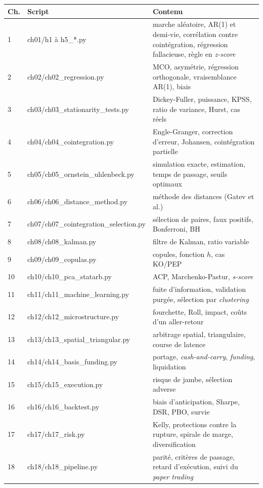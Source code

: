 \begin{center}\small
\begin{longtable}{>{\raggedright}p{1.1cm}>{\ttfamily\footnotesize}p{6.4cm}>{\raggedright\arraybackslash}p{6.0cm}}
\toprule
Ch. & \normalfont Script & Contenu \\
\midrule
\endhead
1 & ch01/h1 à h5\_*.py & marche aléatoire, AR(1) et demi-vie, corrélation contre cointégration, régression fallacieuse, règle en \emph{z-score} \\
2 & ch02/ch02\_regression.py & MCO, asymétrie, régression orthogonale, vraisemblance AR(1), biais \\
3 & ch03/ch03\_stationarity\_tests.py & Dickey-Fuller, puissance, KPSS, ratio de variance, Hurst, cas réels \\
4 & ch04/ch04\_cointegration.py & Engle-Granger, correction d'erreur, Johansen, cointégration partielle \\
5 & ch05/ch05\_ornstein\_uhlenbeck.py & simulation exacte, estimation, temps de passage, seuils optimaux \\
6 & ch06/ch06\_distance\_method.py & méthode des distances (Gatev et al.) \\
7 & ch07/ch07\_cointegration\_selection.py & sélection de paires, faux positifs, Bonferroni, BH \\
8 & ch08/ch08\_kalman.py & filtre de Kalman, ratio variable \\
9 & ch09/ch09\_copulas.py & copules, fonction $h$, cas KO/PEP \\
10 & ch10/ch10\_pca\_statarb.py & ACP, Marchenko-Pastur, \emph{s-score} \\
11 & ch11/ch11\_machine\_learning.py & fuite d'information, validation purgée, sélection par \emph{clustering} \\
12 & ch12/ch12\_microstructure.py & fourchette, Roll, impact, coûts d'un aller-retour \\
13 & ch13/ch13\_spatial\_triangular.py & arbitrage spatial, triangulaire, course de latence \\
14 & ch14/ch14\_basis\_funding.py & portage, \emph{cash-and-carry}, \emph{funding}, liquidation \\
15 & ch15/ch15\_execution.py & risque de jambe, sélection adverse \\
16 & ch16/ch16\_backtest.py & biais d'anticipation, Sharpe, DSR, PBO, survie \\
17 & ch17/ch17\_risk.py & Kelly, protections contre la rupture, spirale de marge, diversification \\
18 & ch18/ch18\_pipeline.py & parité, critères de passage, retard d'exécution, suivi du \emph{paper trading} \\
\bottomrule
\end{longtable}
\end{center}

